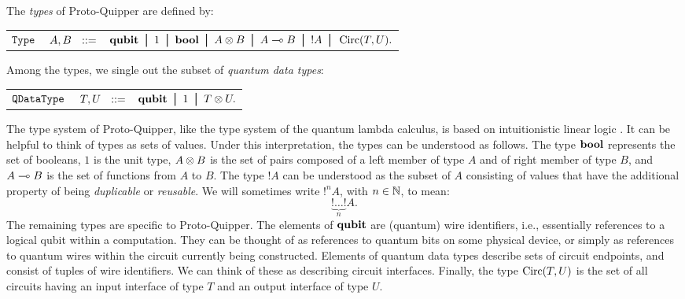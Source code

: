 \documentclass[twoside]{article}
\begin{document}
\begin{definition} 
The \emph{types} of Proto-Quipper are defined by:
\begin{center}
\begin{tabular}{rrl}
$\texttt{Type}$&$~A,B~~::=$ & $ \qubit \bor 1 \bor \bool \bor A\tensor B \bor 
A\loli B \bor {!}A \bor \Circ (T,U).$\\
\end{tabular}
\end{center}
Among the types, we single out the subset of \emph{quantum data types}:
\begin{center}
\begin{tabular}{rrl}
$\texttt{QDataType}$&$~T,U~~::=$ & $\qubit \bor 1 \bor T \tensor U.$
\end{tabular}
\end{center}
\end{definition}

The type system of Proto-Quipper, like the type system of the quantum
lambda calculus, is based on intuitionistic linear logic
{\cite{Gir87}}.  It can be helpful to think of types as sets of
values. Under this interpretation, the types can be understood as
follows. The type $\textrm{\bf bool}$ represents the set of booleans, $1$ is the
unit type, $A\otimes B$ is the set of pairs composed of a left member of
type $A$ and of right member of type $B$, and $A\multimap B$ is the set of
functions from $A$ to $B$. The type ${!}A$ can be understood as the
subset of $A$ consisting of values that have the additional property
of being \emph{duplicable} or \emph{reusable}. We will sometimes write
${!}^nA$, with $n\in\mathbb{N}$, to mean:
\[
\underbrace{{!}\ldots {!}}_{n} A.
\]
The remaining types are specific to Proto-Quipper. The elements of
$\textrm{\bf qubit}$ are (quantum) wire identifiers, i.e., essentially references
to a logical qubit within a computation. They can be thought of as
references to quantum bits on some physical device, or simply as
references to quantum wires within the circuit currently being
constructed. Elements of quantum data types describe sets of circuit
endpoints, and consist of tuples of wire identifiers. We can think of
these as describing circuit interfaces. Finally, the type $\mathop{\textrm{Circ}}\nolimits(T,U)$
is the set of all circuits having an input interface of type $T$ and 
an output interface of type $U$. 
\end{document}

